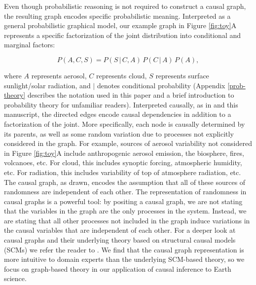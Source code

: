 \documentclass[12pt]{article}
\begin{document}
Even though probabilistic reasoning is not required to construct a
causal graph, the resulting graph encodes specific probabilistic
meaning. Interpreted as a general probabilistic graphical model, our
example graph in Figure \ref{fig:toy}A represents a specific
factorization of the joint distribution into conditional and marginal
factors:

\begin{equation}
  P(A, C, S) = P(S \, | \,C, A) \, P(C \, | \, A) \, P(A),
\end{equation}

where $A$ represents aerosol, $C$ represents cloud, $S$ represents
surface sunlight/solar radiation, and $|$ denotes conditional
probability (Appendix \ref{prob-theory} describes the notation used in
this paper and a brief introduction to probability theory for
unfamiliar readers). Interpreted causally, as in
\citet{pearl1995causal} and this manuscript, the directed edges encode
causal dependencies in addition to a factorization of the joint. More
specifically, each node is causally determined by its parents, as well
as some random variation due to processes not explicitly considered in
the graph. For example, sources of aerosol variability not considered
in Figure \ref{fig:toy}A include anthropogenic aerosol emission, the
biosphere, fires, volcanoes, etc. For cloud, this includes synoptic
forcing, atmospheric humidity, etc. For radiation, this includes
variability of top of atmosphere radiation, etc. The causal graph, as
drawn, encodes the assumption that all of these sources of randomness
are independent of each other. The representation of randomness in
causal graphs is a powerful tool: by positing a causal graph, we are
not stating that the variables in the graph are the only processes in
the system. Instead, we are stating that all other processes not
included in the graph induce variations in the causal variables that
are independent of each other. For a deeper look at causal graphs and
their underlying theory based on structural causal models (SCMs) we
refer the reader to \citet{pearl2009}. We find that the causal graph
representation is more intuitive to domain experts than the underlying
SCM-based theory, so we focus on graph-based theory in our application
of causal inference to Earth science.
\end{document}
